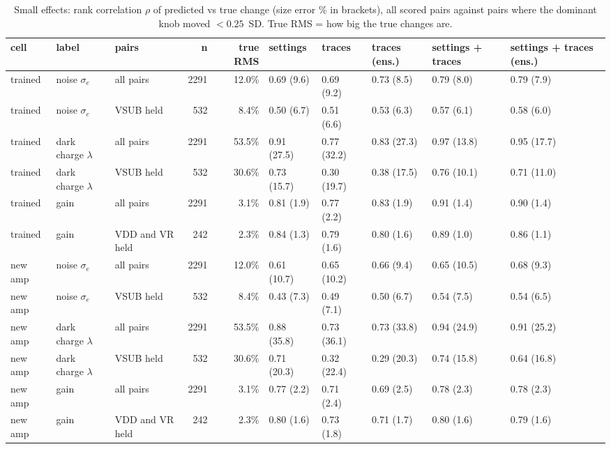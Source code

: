 \begin{table}[H]\centering\scriptsize
\caption{Small effects: rank correlation $\rho$ of predicted vs true change (size error \% in brackets), all scored pairs against pairs where the dominant knob moved $<0.25$~SD. True RMS = how big the true changes are.}\label{tab:subtle}
\begin{tabular}{lllr rlllll}\toprule
cell & label & pairs & n & true RMS & settings & traces & traces (ens.) & settings + traces & settings + traces (ens.)\\\midrule
trained & noise $\sigma_e$ & all pairs & 2291 & 12.0\% & 0.69 (9.6) & 0.69 (9.2) & 0.73 (8.5) & 0.79 (8.0) & 0.79 (7.9)\\
trained & noise $\sigma_e$ & VSUB held & 532 & 8.4\% & 0.50 (6.7) & 0.51 (6.6) & 0.53 (6.3) & 0.57 (6.1) & 0.58 (6.0)\\
trained & dark charge $\lambda$ & all pairs & 2291 & 53.5\% & 0.91 (27.5) & 0.77 (32.2) & 0.83 (27.3) & 0.97 (13.8) & 0.95 (17.7)\\
trained & dark charge $\lambda$ & VSUB held & 532 & 30.6\% & 0.73 (15.7) & 0.30 (19.7) & 0.38 (17.5) & 0.76 (10.1) & 0.71 (11.0)\\
trained & gain & all pairs & 2291 & 3.1\% & 0.81 (1.9) & 0.77 (2.2) & 0.83 (1.9) & 0.91 (1.4) & 0.90 (1.4)\\
trained & gain & VDD and VR held & 242 & 2.3\% & 0.84 (1.3) & 0.79 (1.6) & 0.80 (1.6) & 0.89 (1.0) & 0.86 (1.1)\\
new amp & noise $\sigma_e$ & all pairs & 2291 & 12.0\% & 0.61 (10.7) & 0.65 (10.2) & 0.66 (9.4) & 0.65 (10.5) & 0.68 (9.3)\\
new amp & noise $\sigma_e$ & VSUB held & 532 & 8.4\% & 0.43 (7.3) & 0.49 (7.1) & 0.50 (6.7) & 0.54 (7.5) & 0.54 (6.5)\\
new amp & dark charge $\lambda$ & all pairs & 2291 & 53.5\% & 0.88 (35.8) & 0.73 (36.1) & 0.73 (33.8) & 0.94 (24.9) & 0.91 (25.2)\\
new amp & dark charge $\lambda$ & VSUB held & 532 & 30.6\% & 0.71 (20.3) & 0.32 (22.4) & 0.29 (20.3) & 0.74 (15.8) & 0.64 (16.8)\\
new amp & gain & all pairs & 2291 & 3.1\% & 0.77 (2.2) & 0.71 (2.4) & 0.69 (2.5) & 0.78 (2.3) & 0.78 (2.3)\\
new amp & gain & VDD and VR held & 242 & 2.3\% & 0.80 (1.6) & 0.73 (1.8) & 0.71 (1.7) & 0.80 (1.6) & 0.79 (1.6)\\
\bottomrule\end{tabular}\end{table}


